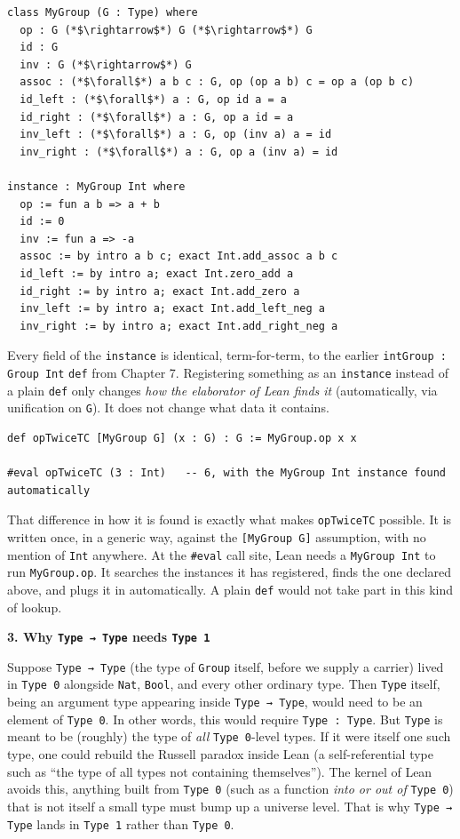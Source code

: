 \begin{lstlisting}
class MyGroup (G : Type) where
  op : G (*$\rightarrow$*) G (*$\rightarrow$*) G
  id : G
  inv : G (*$\rightarrow$*) G
  assoc : (*$\forall$*) a b c : G, op (op a b) c = op a (op b c)
  id_left : (*$\forall$*) a : G, op id a = a
  id_right : (*$\forall$*) a : G, op a id = a
  inv_left : (*$\forall$*) a : G, op (inv a) a = id
  inv_right : (*$\forall$*) a : G, op a (inv a) = id

instance : MyGroup Int where
  op := fun a b => a + b
  id := 0
  inv := fun a => -a
  assoc := by intro a b c; exact Int.add_assoc a b c
  id_left := by intro a; exact Int.zero_add a
  id_right := by intro a; exact Int.add_zero a
  inv_left := by intro a; exact Int.add_left_neg a
  inv_right := by intro a; exact Int.add_right_neg a
\end{lstlisting}

Every field of the \texttt{instance} is identical, term-for-term, to the earlier \texttt{intGroup : Group Int} \texttt{def} from Chapter 7. Registering something as an \texttt{instance} instead of a plain \texttt{def} only changes \emph{how the elaborator of Lean finds it} (automatically, via unification on \texttt{G}). It does not change what data it contains.

\begin{lstlisting}
def opTwiceTC [MyGroup G] (x : G) : G := MyGroup.op x x

#eval opTwiceTC (3 : Int)   -- 6, with the MyGroup Int instance found automatically
\end{lstlisting}

That difference in how it is found is exactly what makes \texttt{opTwiceTC} possible. It is written once, in a generic way, against the \texttt{[MyGroup G]} assumption, with no mention of \texttt{Int} anywhere. At the \texttt{\#eval} call site, Lean needs a \texttt{MyGroup Int} to run \texttt{MyGroup.op}. It searches the instances it has registered, finds the one declared above, and plugs it in automatically. A plain \texttt{def} would not take part in this kind of lookup.

\textbf{3. Why \texttt{Type → Type} needs \texttt{Type 1}}

Suppose \texttt{Type → Type} (the type of \texttt{Group} itself, before we supply a carrier) lived in \texttt{Type 0} alongside \texttt{Nat}, \texttt{Bool}, and every other ordinary type. Then \texttt{Type} itself, being an argument type appearing inside \texttt{Type → Type}, would need to be an element of \texttt{Type 0}. In other words, this would require \texttt{Type : Type}. But \texttt{Type} is meant to be (roughly) the type of \emph{all} \texttt{Type 0}-level types. If it were itself one such type, one could rebuild the Russell paradox inside Lean (a self-referential type such as ``the type of all types not containing themselves''). The kernel of Lean avoids this, anything built from \texttt{Type 0} (such as a function \emph{into or out of} \texttt{Type 0}) that is not itself a small type must bump up a universe level. That is why \texttt{Type → Type} lands in \texttt{Type 1} rather than \texttt{Type 0}.

